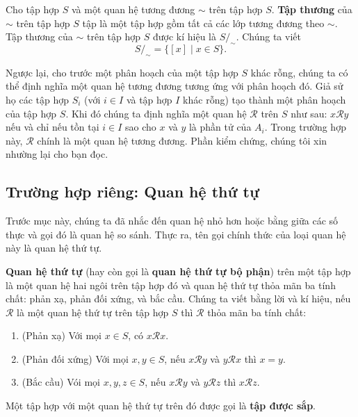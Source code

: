 \begin{definition}
    Cho tập hợp $S$ và một quan hệ tương đương $\sim$ trên tập hợp $S$. \@\textbf{Tập thương} của $\sim$ trên tập hợp $S$ tập là một tập hợp gồm tất cả các lớp tương đương theo $\sim$. Tập thương của $\sim$ trên tập hợp $S$ được kí hiệu là $S/_{\sim}$. Chúng ta viết
    \[
        S/_{\sim} = \{ [x] \mid x\in S \}.
    \]
\end{definition}

Ngược lại, cho trước một phân hoạch của một tập hợp $S$ khác rỗng, chúng ta có thể định nghĩa một quan hệ tương đương tương ứng với phân hoạch đó. Giả sử họ các tập hợp $S_{i}$ (với $i\in I$ và tập hợp $I$ khác rỗng) tạo thành một phân hoạch của tập hợp $S$. Khi đó chúng ta định nghĩa một quan hệ $\mathscr{R}$ trên $S$ như sau: $x\mathscr{R}y$ nếu và chỉ nếu tồn tại $i\in I$ sao cho $x$ và $y$ là phần tử của $A_{i}$. Trong trường hợp này, $\mathscr{R}$ chính là một quan hệ tương đương. Phần kiểm chứng, chúng tôi xin nhường lại cho bạn đọc.

\subsection{Trường hợp riêng: Quan hệ thứ tự}\label{subsection:order-relation}

Trước mục này, chúng ta đã nhắc đến quan hệ nhỏ hơn hoặc bằng giữa các số thực và gọi đó là quan hệ so sánh. Thực ra, tên gọi chính thức của loại quan hệ này là quan hệ thứ tự.

\begin{definition}
    \textbf{Quan hệ thứ tự} (hay còn gọi là \textbf{quan hệ thứ tự bộ phận}) trên một tập hợp là một quan hệ hai ngôi trên tập hợp đó và quan hệ thứ tự thỏa mãn ba tính chất: phản xạ, phản đối xứng, và bắc cầu. Chúng ta viết bằng lời và kí hiệu, nếu $\mathscr{R}$ là một quan hệ thứ tự trên tập hợp $S$ thì $\mathscr{R}$ thỏa mãn ba tính chất:
    \begin{enumerate}[label={(\roman*)}]
        \item (Phản xạ) Với mọi $x\in S$, có $x\mathscr{R}x$.
        \item (Phản đối xứng) Với mọi $x, y\in S$, nếu $x\mathscr{R}y$ và $y\mathscr{R}x$ thì $x = y$.
        \item (Bắc cầu) Vói mọi $x, y, z\in S$, nếu $x\mathscr{R}y$ và $y\mathscr{R}z$ thì $x\mathscr{R}z$.
    \end{enumerate}

    \noindent Một tập hợp với một quan hệ thứ tự trên đó được gọi là \textbf{tập được sắp}.
\end{definition}

